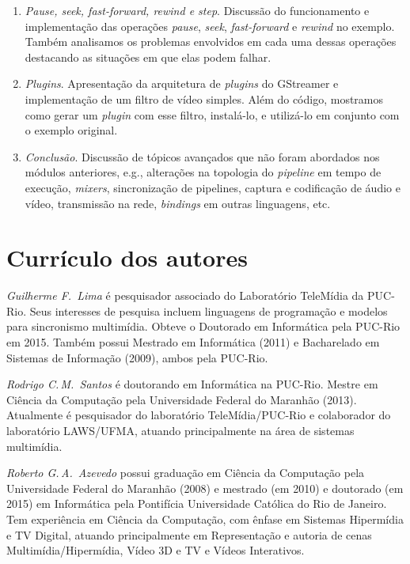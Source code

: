 \documentclass{SBCbookchapter}
\begin{document}
\begin{enumerate}
\item\emph{Pause, seek, fast-forward, rewind e step}.  Discussão do
  funcionamento e implementação das operações \emph{pause}, \emph{seek},
  \emph{fast-forward} e \emph{rewind} no exemplo.  Também analisamos os
  problemas envolvidos em cada uma dessas operações destacando as situações
  em que elas podem falhar.

\item\emph{Plugins}.  Apresentação da arquitetura de \emph{plugins} do
  GStreamer e implementação de um filtro de vídeo simples.  Além do código,
  mostramos como gerar um \emph{plugin} com esse filtro, instalá-lo, e
  utilizá-lo em conjunto com o exemplo original.

\item\emph{Conclusão}.  Discussão de tópicos avançados que não foram
  abordados nos módulos anteriores, e.g., alterações na topologia do
  \emph{pipeline} em tempo de execução, \emph{mixers}, sincronização de
  pipelines, captura e codificação de áudio e vídeo, transmissão na rede,
  \emph{bindings} em outras linguagens, etc.
\end{enumerate}


\section{Currículo dos autores}

\noindent\emph{Guilherme F.~Lima} é pesquisador associado do Laboratório
TeleMídia da PUC-Rio.  Seus interesses de pesquisa incluem linguagens de
programação e modelos para sincronismo multimídia.  Obteve o Doutorado em
Informática pela PUC-Rio em 2015.  Também possui Mestrado em Informática
(2011) e Bacharelado em Sistemas de Informação (2009), ambos pela PUC-Rio.

\noindent\emph{Rodrigo C.\,M.~Santos} é doutorando em Informática na
PUC-Rio.  Mestre em Ciência da Computação pela Universidade Federal do
Maranhão (2013).  Atualmente é pesquisador do laboratório TeleMídia/PUC-Rio
e colaborador do laboratório LAWS/UFMA, atuando principalmente na área de
sistemas multimídia.

\noindent\emph{Roberto G.\,A.~Azevedo} possui graduação em Ciência da
Computação pela Universidade Federal do Maranhão (2008) e mestrado (em 2010)
e doutorado (em 2015) em Informática pela Pontifícia Universidade Católica
do Rio de Janeiro. Tem experiência em Ciência da Computação, com ênfase em
Sistemas Hipermídia e TV Digital, atuando principalmente em Representação e
autoria de cenas Multimídia/Hipermídia, Vídeo 3D e TV e Vídeos Interativos.
\end{document}
